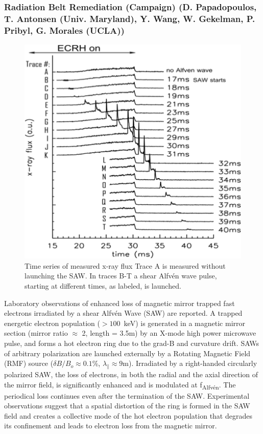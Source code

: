 \documentclass[11pt]{article}
\begin{document}
\subsubsection{Radiation Belt Remediation (Campaign) (D. Papadopoulos,
  T. Antonsen (Univ. Maryland), Y. Wang, W. Gekelman, P. Pribyl, G.
Morales (UCLA))}
\begin{figure}
\begin{center}
\includegraphics[width=3.0truein]{muri1}
\caption{Time series of measured x-ray flux
Trace A is measured without launching the SAW. In traces B-T a
shear Alfv\'{e}n wave pulse, starting at
different times, as labeled, is launched. }\label{muri1}
\end{center}
\end{figure}

Laboratory observations of enhanced loss of magnetic mirror trapped fast
electrons irradiated by a shear Alfv\'{e}n Wave (SAW) are reported. A
trapped energetic electron population ($> 100$~keV) is
generated in a magnetic mirror section (mirror ratio $\approx$ 2,
length = 3.5m) by an X-mode high power microwave pulse, and forms a hot electron
ring due to the grad-B and curvature drift. SAWs of arbitrary
polarization are launched externally by a Rotating Magnetic Field (RMF)
source ($\delta B/B_o \approx 0.1$\%, $\lambda_\parallel \approx 9$m).
Irradiated by a right-handed circularly polarized SAW, the loss of
electrons, in both the radial and the axial direction of the mirror
field, is significantly enhanced and is modulated at
f\textsubscript{Alfv\'{e}n}. The periodical loss continues even after the
termination of the SAW. Experimental observations suggest that a spatial
distortion of the ring is formed in the SAW field and creates a
collective mode of the hot electron population that degrades its
confinement and leads to electron loss from the magnetic mirror.
\end{document}

